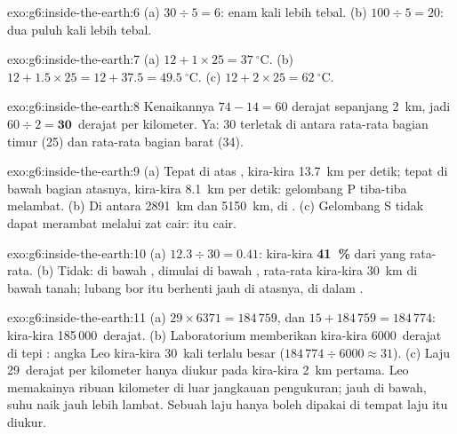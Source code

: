 \begin{solution}{exo:g6:inside-the-earth:6}
(a) $30 \div 5 = 6$: enam kali lebih tebal. (b) $100 \div 5 = 20$: dua puluh
kali lebih tebal.
\end{solution}

\begin{solution}{exo:g6:inside-the-earth:7}
(a) $12 + 1 \times 25 = 37~^\circ$C. (b) $12 + 1.5 \times 25 = 12 + 37.5 =
49.5~^\circ$C. (c) $12 + 2 \times 25 = 62~^\circ$C.
\end{solution}

\begin{solution}{exo:g6:inside-the-earth:8}
Kenaikannya $74 - 14 = 60$ derajat sepanjang 2~km, jadi $60 \div 2 =
\textbf{30}$~derajat per kilometer. Ya: 30 terletak di antara rata-rata
bagian timur (25) dan rata-rata bagian barat (34).
\end{solution}

\begin{solution}{exo:g6:inside-the-earth:9}
(a) Tepat di atas , kira-kira 13.7~km per detik; tepat di bawah bagian
atasnya, kira-kira 8.1~km per detik: gelombang P tiba-tiba melambat.
(b) Di antara 2891~km dan 5150~km, di . (c) Gelombang S tidak dapat
merambat melalui zat cair:  itu cair.
\end{solution}

\begin{solution}{exo:g6:inside-the-earth:10}
(a) $12.3 \div 30 = 0.41$: kira-kira \textbf{41~\%} dari   yang
rata-rata. (b) Tidak: di bawah ,  dimulai di bawah ,
rata-rata kira-kira 30~km di bawah tanah; lubang bor itu berhenti jauh di
atasnya, di dalam .
\end{solution}

\begin{solution}{exo:g6:inside-the-earth:11}
(a) $29 \times 6371 = 184\,759$, dan $15 + 184\,759 = 184\,774$: kira-kira
185\,000~derajat. (b) Laboratorium memberikan kira-kira 6000~derajat di
tepi : angka Leo kira-kira 30~kali terlalu besar
($184\,774 \div 6000 \approx 31$). (c) Laju 29~derajat per kilometer hanya
diukur pada kira-kira 2~km pertama. Leo memakainya ribuan kilometer di luar
jangkauan pengukuran; jauh di bawah, suhu naik jauh lebih lambat. Sebuah
laju hanya boleh dipakai di tempat laju itu diukur.
\end{solution}

